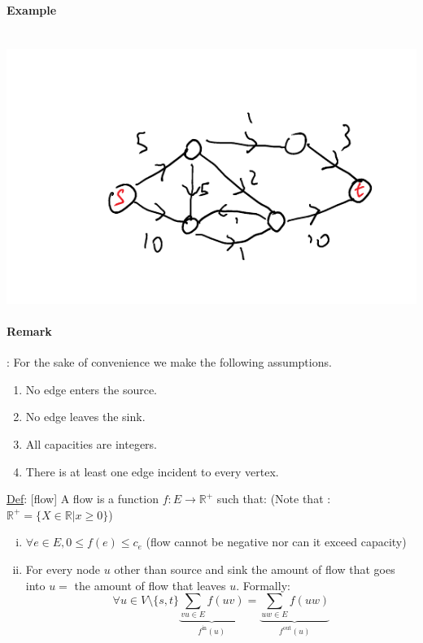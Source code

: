 \documentclass[12 pt]{article}
\begin{document}
            \paragraph{Example}~\\
                \includegraphics[width=.7\linewidth]{i2.pdf}
            \paragraph{Remark}: For the sake of convenience we make
            the following assumptions.
            \begin{enumerate}
            \item No edge enters the source.
            \item No edge leaves the sink.
            \item All capacities are integers.
            \item There is at least one edge incident to every vertex.
            \end{enumerate}
            \underline{Def}: [flow] A flow is a function $f:E
            \rightarrow \mathbb{R}^+$ such that: (Note that :$\mathbb{R}^+ = \{X \in
            \mathbb{R} | x \geq 0\}$)
            \begin{enumerate}[(i)]
            \item \text{[capacity]} $\forall e \in E, 0 \leq f(e) \leq
              c_e$ (flow cannot be negative nor can it exceed
              capacity)
            \item \text{[conservation]} For every node $u$ other than
              source and sink the amount of flow that goes into $u=$
              the amount of flow that leaves $u$. Formally:
              $$\forall u \in V\setminus\{s,t\} \underbrace{\sum_{vu\in E}f(uv)}_{f^{\text{in}}(u)} = \underbrace{\sum_{uw\in E}f(uw)}_{f^{\text{out}}(u)}$$
            \end{enumerate}
\end{document}
